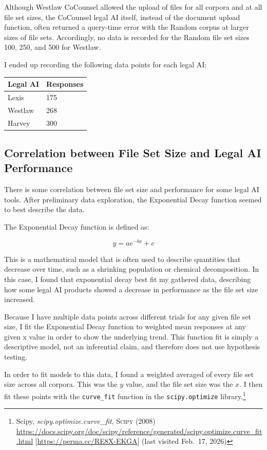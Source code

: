 \documentclass[
]{article}
\newcounter{none} %
\begin{document}
Although Westlaw CoCounsel allowed the upload of files for all corpora and at all file set sizes, the CoCounsel legal AI itself, instead of the document upload function, often returned a query-time error with the Random corpus at larger sizes of file sets. Accordingly, no data is recorded for the Random file set sizes 100, 250, and 500 for Westlaw.

I ended up recording the following data points for each legal AI:

{\def\LTcaptype{none} %
\begin{longtable}[]{@{}ll@{}}
\toprule\noalign{}
Legal AI & Responses \\
\midrule\noalign{}
\endhead
\bottomrule\noalign{}
\endlastfoot
Lexis & 175 \\
Westlaw & 268 \\
Harvey & 300 \\
\end{longtable}
}

\subsection{Correlation between File Set Size and Legal AI Performance}\label{correlation-between-file-set-size-and-legal-ai-performance}

There is some correlation between file set size and performance for some legal AI tools. After preliminary data exploration, the Exponential Decay function seemed to best describe the data.

The Exponential Decay function is defined as:

\[y = ae^{-bx} + c\]

This is a mathematical model that is often used to describe quantities that decrease over time, such as a shrinking population or chemical decomposition. In this case, I found that exponential decay best fit my gathered data, describing how some legal AI products showed a decrease in performance as the file set size increased.

Because I have multiple data points across different trials for any given file set size, I fit the Exponential Decay function to weighted mean responses at any given x value in order to show the underlying trend. This function fit is simply a descriptive model, not an inferential claim, and therefore does not use hypothesis testing.

In order to fit models to this data, I found a weighted averaged of every file set size across all corpora. This was the \(y\) value, and the file set size was the \(x\). I then fit these points with the \texttt{curve\_fit} function in the \texttt{scipy.optimize} library.\footnote{Scipy, \emph{scipy.optimize.curve\_fit}, \textsc{Scipy} (2008) \url{https://docs.scipy.org/doc/scipy/reference/generated/scipy.optimize.curve_fit.html} {[}\url{https://perma.cc/RE8X-EKGA}{]} (last visited Feb.~17, 2026)}
\end{document}
